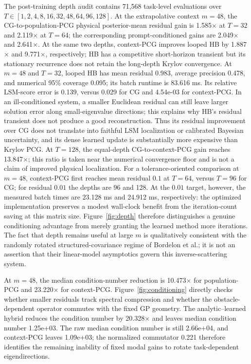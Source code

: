 \documentclass[10pt]{article}
\begin{document}
The post-training depth audit contains
71,568 task-level evaluations over
$T\in[1, 2, 4, 8, 16, 32, 48, 64, 96, 128]$.  At the extrapolative context
$m=48$, the CG-to-population-PCG physical
posterior-mean residual gain is
1.585$\times$
at $T=32$ and
2.119$\times$
at $T=64$; the corresponding prompt-conditioned gains are
2.049$\times$
and
2.641$\times$.
At the same two depths, context-PCG improves looped HB by
1.887$\times$ and
9.771$\times$,
respectively; HB has a competitive short-horizon transient but its stationary
recurrence does not retain the long-depth Krylov convergence.
At $m=48$ and $T=32$, looped HB has mean residual
0.983,
average precision
0.478,
and numerical 95\% coverage
0.095; its
batch runtime is
83.616 ms.
Its relative LSM-score error is
0.139,
versus 0.029
for CG and
4.54e-03
for context-PCG.  In an ill-conditioned system, a smaller Euclidean residual
can still leave larger solution error along small-eigenvalue directions; this
explains why HB's residual transient does not produce a good reconstruction.
Thus its residual improvement over CG does not translate into faithful LSM
localization or calibrated Bayesian uncertainty, and its dense learned update
is substantially more expensive than Krylov PCG.
At $T=128$, the equal-depth CG-to-context-PCG gain reaches
13.847$\times$;
this ratio is taken near the numerical convergence floor and is not a claim of
improved physical localization.
For a tolerance-oriented comparison at $m=48$,
context-PCG first reaches mean residual $0.1$ at $T=
64$, versus $T=
96$ for CG; for residual $0.01$ the
depths are 96 and
128.
At the $0.01$ target, however, the measured batch times are
23.128 ms and
24.912 ms, respectively:
the optimized implementation preserves a modest wall-clock benefit from the
iteration-count saving at this matrix size.
Figure~\ref{fig:depth} therefore distinguishes a genuine
conditioning advantage from merely granting the learned method more
iterations.  The fact that depth remains useful at large $m$ is qualitatively
consistent with the randomly rotated structured-covariance regime of
Bordelon et al.; it is not an assertion that their linear-model asymptotics
govern this inverse-scattering system.



At $m=48$, the median condition-number reduction is
10.473$\times$
for population-PCG and
23.220$\times$
for context-PCG.  Figure~\ref{fig:conditioning} directly checks whether
smaller residuals track spectral compression and whether the obstacle-dependent
operator commutes with the fixed GP geometry.
The analytic--learned hybrid reduces the condition number by
20.328$\times$
and leaves median condition number
1.25e+03.
The raw median condition number is still
2.66e+04, and
context-PCG leaves
1.09e+03; the
normalized commutator
0.221
therefore identifies the remaining inability of fixed modal gains to rotate
task-dependent eigendirections.
\end{document}
